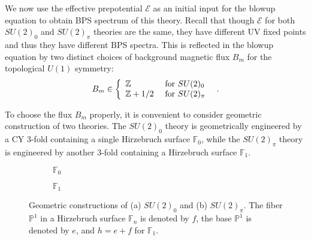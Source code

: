 We now use the effective prepotential $\mathcal{E}$ as an initial input for the blowup equation to obtain BPS spectrum of this theory. Recall that though $\mathcal{E}$ for both $SU(2)_0$ and $SU(2)_\pi$ theories are the same, they have different UV fixed points and thus they have different BPS spectra. This is reflected in the blowup equation by two distinct choices of background magnetic flux $B_m$ for the topological $U(1)$ symmetry: 
\begin{equation}
B_m \in \left\{ \begin{array}{ll} \mathbb{Z} &\ {\rm for} \ SU(2)_0\  \\ \mathbb{Z}+1/2 & \ {\rm for} \ SU(2)_\pi \end{array}\right.\ .
\end{equation}

To choose the flux $B_m$ properly, it is convenient to consider geometric construction of two theories. The $SU(2)_0$ theory is geometrically engineered by a CY 3-fold containing a single Hirzebruch surface $ \mathbb{F}_0 $, while the $SU(2)_\pi$ theory is engineered by another 3-fold containing a Hirzebruch surface $ \mathbb{F}_1 $.
\begin{figure}
	\centering
	\begin{subfigure}{0.45\textwidth}
		\centering
		\caption{$ \mathbb{F}_0 $}
	\end{subfigure}
	\begin{subfigure}{0.45\textwidth}
		\centering
		\caption{$ \mathbb{F}_1 $}
	\end{subfigure}
	\caption{Geometric constructions of (a) $ SU(2)_0 $ and (b) $ SU(2)_\pi $. The fiber $\mathbb{P}^1$ in a Hirzebruch surface $\mathbb{F}_n$ is denoted by $f$, the base $\mathbb{P}^1$ is denoted by $e$, and $h=e+f$ for $\mathbb{F}_1$. } \label{fig:SU2}
\end{figure}
